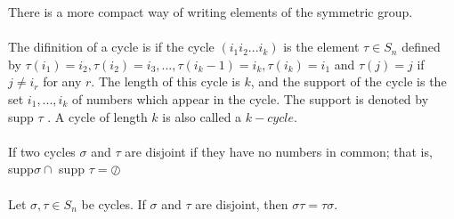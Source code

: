 There is a more compact way of writing elements of the symmetric group.

\paragraph{}
The difinition of a cycle is if the cycle $(i_1  i_2 ... i_k )$ is the element $\tau \in S_n$ defined by $\tau(i_1 ) = i_2 , \tau(i_2 ) = i_3 , . . . , \tau(i_k  -1) =
i_k , \tau(i_k ) = i_1 $ and $\tau(j) = j$ if $j \neq i_r $ for any $r$. The length of this cycle is $k$, and the support of the cycle
is the set ${i_1 , . . . , i_k }$ of numbers which appear in the cycle. The support is denoted by supp $\tau$ . A cycle of
length $k$ is also called a $k-cycle$.
\paragraph{}
If two cycles $\sigma$ and $\tau$ are disjoint if they have no numbers in common; that is, supp$\sigma \cap$ 
supp $\tau = \oslash$
\paragraph{}
Let $\sigma,\tau\in S_n$ be cycles. If $\sigma$ and $\tau$ are disjoint, then $\sigma\tau = \tau\sigma$.
